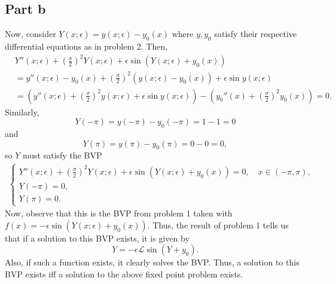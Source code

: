 \documentclass{article}
\begin{document}
\subsection{Part b}
Now, consider $Y(x;\epsilon) = y(x;\epsilon) - y_0(x)$ where $y,y_0$ satisfy their respective differential equations as in problem 2. Then,
\begin{align*}
&Y''(x;\epsilon) + \left(\frac{\sigma}{2} \right)^2 Y(x;\epsilon) + \epsilon \sin \left( Y(x;\epsilon) + y_0(x) \right)\\&=
y''(x;\epsilon) -y_0(x) +\left(\frac{\sigma}{2} \right)^2 (y(x;\epsilon)-y_0(x)) + \epsilon \sin y(x;\epsilon)\\&=
\left(y''(x;\epsilon) + \left(\frac{\sigma}{2} \right)^2 y(x;\epsilon) + \epsilon \sin y(x;\epsilon)\right)-\left(y_0''(x)+\left(\frac{\sigma}{2} \right)^2y_0(x)\right)=0.
\end{align*}
Similarly,
\[
Y(-\pi)=y(-\pi)-y_0(-\pi)=1-1=0
\]
and 
\[
Y(\pi)=y(\pi)-y_0(\pi)=0-0=0,
\]
so $Y$ must satisfy the BVP
\begin{align*}
    \begin{cases} Y''(x;\epsilon) + \left(\frac{\sigma}{2} \right)^2 Y(x;\epsilon) + \epsilon \sin \left( Y(x;\epsilon) + y_0(x) \right) = 0, \quad x \in (-\pi,\pi),\\
      Y(-\pi) = 0,\\
      Y(\pi) = 0. \end{cases}
    \end{align*}
Now, observe that this is the BVP from problem 1 taken with $f(x)=-\epsilon \sin \left( Y(x;\epsilon) + y_0(x) \right)$. Thus, the result of problem 1 tells us that if a solution to this BVP exists, it is given by
\[
Y = -\epsilon \mathcal L \sin(Y + y_0).
\]
Also, if such a function exists, it clearly solves the BVP. Thus, a solution to this BVP exists iff a solution to the above fixed point problem exists.
\end{document}

